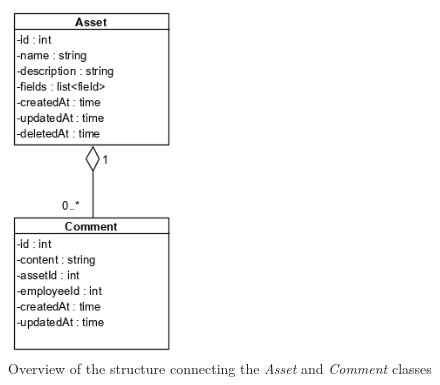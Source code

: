\begin{figure}[H]
    \centering
    \includegraphics[width=0.4\textwidth]{figures/Structures/AssetCommentStructure.png}
    \caption{Overview of the structure connecting the \textit{Asset} and \textit{Comment} classes}
    \label{fig:AssetCommentStructure}
\end{figure}




